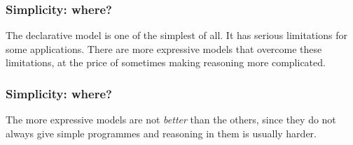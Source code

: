 \documentclass{beamer}
\begin{document}
\begin{frame}
\frametitle{Simplicity: where?}
The declarative model is one of the simplest of all. It has serious
limitations for some applications. There are more expressive models
that overcome these limitations, at the price of sometimes making
reasoning more complicated.
\end{frame}

\begin{frame}
\frametitle{Simplicity: where?}
The more expressive models are not \textit{better} than the others,
since they do not always give simple programmes and reasoning in them
is usually harder.
\end{frame}
\end{document}
